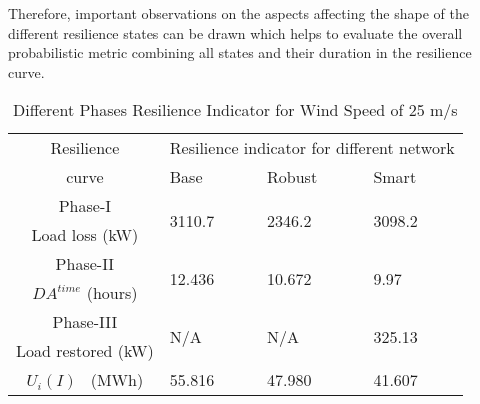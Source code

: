 \documentclass[12pt]{article}
\begin{document}
Therefore, important observations on the aspects affecting the shape of the different resilience states can be drawn which helps to evaluate the overall probabilistic metric combining all states and their duration in the resilience curve.



 \begin{table}[t]
     \vspace{-0.5cm}
        \centering
        \caption{Different Phases Resilience Indicator for Wind Speed of 25 m/s}
        \vspace{-0.1 cm}
        \label{table:2}
        \begin{tabular}{c p{2.25cm}p{2.25cm}p{2.25cm}}
            \toprule[0.4 mm]
            \hline
            \multirow{1}{*}{Resilience }&\multicolumn{3}{c}{Resilience indicator for different network}\\
            \cline{2-4}
            curve & Base & Robust & Smart \\
            \hline
            Phase-I&\multirow{2}{*}{3110.7} &\multirow{2}{*}{2346.2}&\multirow{2}{*}{3098.2} \\
            Load loss (kW)&&&\\
            \hline
            Phase-II&\multirow{2}{*}{12.436} &\multirow{2}{*}{10.672}&\multirow{2}{*}{9.97} \\
            $DA^{time}$ (hours)&&&\\
            \hline
            Phase-III&\multirow{2}{*}{N/A} &\multirow{2}{*}{N/A}&\multirow{2}{*}{325.13} \\
            Load restored (kW)&&&\\
            \hline
            $U_i(I)$ \ (MWh)&\multirow{1}{*}{55.816}&\multirow{1}{*}{47.980}&\multirow{1}{*}{41.607}\\
            \toprule[0.4 mm]
        \end{tabular}
        \vspace{-0.5 cm}
    \end{table}
 
\end{document}
